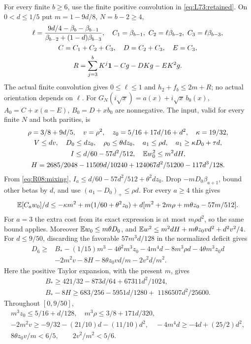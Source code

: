 For every finite $b\ge6$, use the finite positive convolution in
\eqref{eq:L73:retained}. On $0<d\le1/5$ put $m=1-9d/8$, $N=b-2\ge4$,
\[
\begin{gathered}
\ell=\frac{9d/4-\beta_b-\beta_{b-1}}
 {\beta_{b-2}+(1-d)\beta_{b-3}},\quad
C_1=\beta_{b-1},\ C_2=\ell\beta_{b-2},\ C_3=\ell\beta_{b-3},\\
C=C_1+C_2+C_3,\quad D=C_2+C_3,\quad E=C_3,\\
R=\sum_{j=3}^bK^j\mathbf1-Cg-DKg-EK^2g.
\end{gathered}
\]
The actual finite convolution gives $0\le\ell\le1$ and
$h_2+f_b\le2m+R$; no actual orientation depends on $\ell$.
For $G_N(i\sqrt x)=a(x)+i\sqrt x\,b_0(x)$,
$A_0=C+x(a-E)$, $B_0=D+xb_0$ are nonnegative.
The input, valid for every finite $N$ and both parities, is
\[
\begin{gathered}
\rho=3/8+9d/5,\quad v=\rho^2,\quad z_0=5/16+17d/16+d^2,
\quad\kappa=19/32,\\
V\le dv,\quad D_0\le dz_0,\quad\rho_0\le\theta dz_0,
\quad a_1\le\rho d,\quad a_1\ge\kappa D_0+\tau d,\\
I\le d/60-57d^2/512,\quad\mathbb E w_0^2\le m^2dH,\\
H=2685/2048-11509d/10240+124067d^2/51200-117d^3/128.
\end{gathered}
\]
From \eqref{eq:R08:mixing},
$I_a\le d/60-57d^2/512+\theta^2dz_0$.
Drop $-mD_0\beta_{a+1}$, bound other betas by $d$, and use
$(a_1-D_0)_+\le\rho d$. For every $a\ge4$ this gives
\[
\mathbb E[C_aw_0]/d\le-\kappa m^2+m(1/60+\theta^2z_0)
+d[m^2+2m\rho+m\theta z_0-57m/512].
\]
For $a=3$ the extra cost from its exact expression is at most
$m\rho d^2$, so the same bound applies. Moreover
$\mathbb E w_0\le m\theta D_0$, and
$\mathbb E w^2\le m^2dH+m\theta z_0vd^2+d^2v^2/4$.
For $d\le9/50$, discarding the favorable $57m^3d/128$ in the
normalized deficit gives
\begin{align*}
D_6\ge{}&B_*-(1/15)m^3-4\theta^2m^3z_0-4m^4d
-8m^3\rho d-4\theta m^3z_0d\\
&-2m^2v-8H-8\theta z_0vd/m-2v^2d/m^2.
\end{align*}
Here the positive Taylor expansion, with the present $m$, gives
\[
\begin{gathered}
B_*\ge421/32-873d/64+67311d^2/1024,\\
B_*-8H\ge683/256-5951d/1280+\;1186507d^2/25600.
\end{gathered}
\]
Throughout $[0,9/50]$,
\[
\begin{gathered}
m^3z_0\le5/16+d/128,\quad m^3\rho\le3/8+171d/320,\\
-2m^2v\ge-9/32-(21/10)d-(11/10)d^2,\quad
-4m^4d\ge-4d+(25/2)d^2,\\
8\theta z_0v/m<6/5,\qquad2v^2/m^2<5/6.
\end{gathered}
\]

